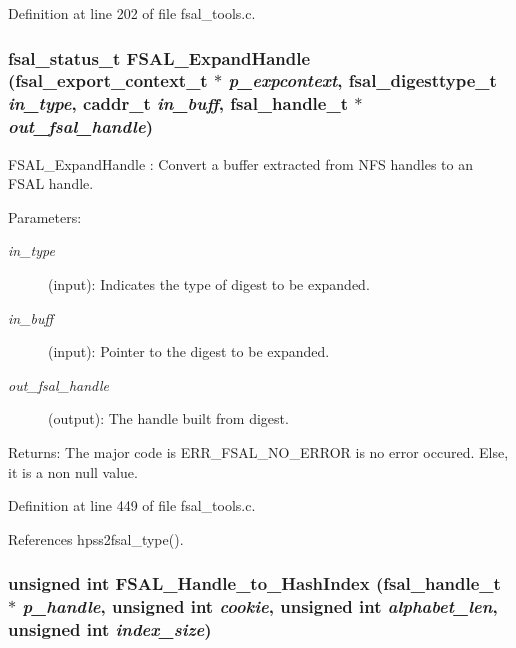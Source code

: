 Definition at line 202 of file fsal\_\-tools.c.
\subsubsection[{FSAL\_\-ExpandHandle}]{\setlength{\rightskip}{0pt plus 5cm}fsal\_\-status\_\-t FSAL\_\-ExpandHandle (fsal\_\-export\_\-context\_\-t $\ast$ {\em p\_\-expcontext}, \/  fsal\_\-digesttype\_\-t {\em in\_\-type}, \/  caddr\_\-t {\em in\_\-buff}, \/  fsal\_\-handle\_\-t $\ast$ {\em out\_\-fsal\_\-handle})}\label{fsal__tools_8c_341eb16cdc47fbf19cbbeb1362301bcc}


FSAL\_\-ExpandHandle : Convert a buffer extracted from NFS handles to an FSAL handle.

\begin{Desc}
\item[Parameters:]
\begin{description}
\item[{\em in\_\-type}](input): Indicates the type of digest to be expanded. \item[{\em in\_\-buff}](input): Pointer to the digest to be expanded. \item[{\em out\_\-fsal\_\-handle}](output): The handle built from digest.\end{description}
\end{Desc}
\begin{Desc}
\item[Returns:]The major code is ERR\_\-FSAL\_\-NO\_\-ERROR is no error occured. Else, it is a non null value. \end{Desc}


Definition at line 449 of file fsal\_\-tools.c.

References hpss2fsal\_\-type().
\subsubsection[{FSAL\_\-Handle\_\-to\_\-HashIndex}]{\setlength{\rightskip}{0pt plus 5cm}unsigned int FSAL\_\-Handle\_\-to\_\-HashIndex (fsal\_\-handle\_\-t $\ast$ {\em p\_\-handle}, \/  unsigned int {\em cookie}, \/  unsigned int {\em alphabet\_\-len}, \/  unsigned int {\em index\_\-size})}\label{fsal__tools_8c_a08050a4cea7a2bd7f00b81687ffca3f}


